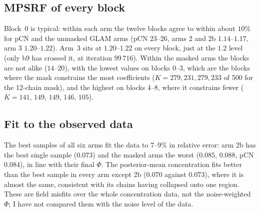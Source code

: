 \documentclass[11pt]{article}
\begin{document}
\subsection{MPSRF of every block}
\begin{table}[h]\centering\small
\resizebox{\textwidth}{!}{}
\caption{MPSRF at 100\,000 iterations for $\rho$, the first 100 coefficients and each of the 12 blocks of 500 coefficients (b0--b11); 24 chains, 6000 samples per chain from iteration 40\,000, growing window, as in Section~\ref{sec:calc}.}
\end{table}
Block~0 is typical: within each arm the twelve blocks agree to within about $10\%$ for pCN and the unmasked GLAM arms (pCN $23$--$26$, arms 2 and 2b $1.14$--$1.17$, arm 3 $1.20$--$1.22$). Arm~3 sits at $1.20$--$1.22$ on every block, just at the $1.2$ level (only b9 has crossed it, at iteration $99\,716$). Within the masked arms the blocks are not alike ($14$--$20$), with the lowest values on blocks 0--3, which are the blocks where the mask constrains the most coefficients ($K=279, 231, 279, 233$ of 500 for the 12-chain mask), and the highest on blocks 4--8, where it constrains fewer ($K=141$, $149$, $149$, $146$, $105$).

\subsection{Fit to the observed data}
\begin{table}[h]\centering\small
\resizebox{\textwidth}{!}{}
\caption{Concentration misfit at 100\,000 iterations: simulated concentration of the best sample and of the posterior mean against the data (all cells and output times). RE $=\|c-c_{\rm data}\|/\|c_{\rm data}\|$; RMSE $=\sqrt{\operatorname{mean}((c-c_{\rm data})^2)}$ in concentration units. The posterior-mean concentration is the average of the sampled concentrations.}
\end{table}
The best samples of all six arms fit the data to $7$--$9\%$ in relative error: arm 2b has the best single sample ($0.073$) and the masked arms the worst ($0.085$, $0.088$, pCN $0.084$), in line with their final $\Phi$. The posterior-mean concentration fits better than the best sample in every arm except 2b ($0.070$ against $0.073$), where it is almost the same, consistent with its chains having collapsed onto one region. These are field misfits over the whole concentration data, not the noise-weighted $\Phi$; I have not compared them with the noise level of the data.
\end{document}
